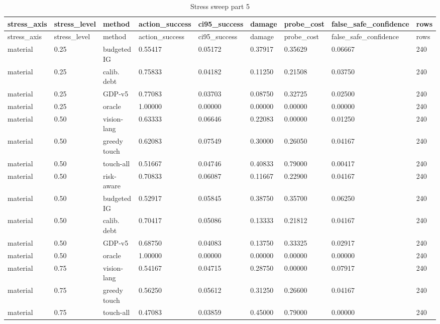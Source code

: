 \documentclass{article}
\begin{document}
\begin{center}
\tiny
\renewcommand{\arraystretch}{0.92}
\setlength{\tabcolsep}{3pt}
\begin{longtable}{lllllllll}
\caption{Stress sweep part 5}\label{tab:stress-sweep-5}\\
\toprule
stress\_axis & stress\_level & method & action\_success & ci95\_success & damage & probe\_cost & false\_safe\_confidence & rows \\
\midrule
\endfirsthead
\toprule
stress\_axis & stress\_level & method & action\_success & ci95\_success & damage & probe\_cost & false\_safe\_confidence & rows \\
\midrule
\endhead
material & 0.25 & budgeted IG & 0.55417 & 0.05172 & 0.37917 & 0.35629 & 0.06667 & 240 \\
material & 0.25 & calib. debt & 0.75833 & 0.04182 & 0.11250 & 0.21508 & 0.03750 & 240 \\
material & 0.25 & GDP-v5 & 0.77083 & 0.03703 & 0.08750 & 0.32725 & 0.02500 & 240 \\
material & 0.25 & oracle & 1.00000 & 0.00000 & 0.00000 & 0.00000 & 0.00000 & 240 \\
material & 0.50 & vision-lang & 0.63333 & 0.06646 & 0.22083 & 0.00000 & 0.01250 & 240 \\
material & 0.50 & greedy touch & 0.62083 & 0.07549 & 0.30000 & 0.26050 & 0.04167 & 240 \\
material & 0.50 & touch-all & 0.51667 & 0.04746 & 0.40833 & 0.79000 & 0.00417 & 240 \\
material & 0.50 & risk-aware & 0.70833 & 0.06087 & 0.11667 & 0.22900 & 0.04167 & 240 \\
material & 0.50 & budgeted IG & 0.52917 & 0.05845 & 0.38750 & 0.35700 & 0.06250 & 240 \\
material & 0.50 & calib. debt & 0.70417 & 0.05086 & 0.13333 & 0.21812 & 0.04167 & 240 \\
material & 0.50 & GDP-v5 & 0.68750 & 0.04083 & 0.13750 & 0.33325 & 0.02917 & 240 \\
material & 0.50 & oracle & 1.00000 & 0.00000 & 0.00000 & 0.00000 & 0.00000 & 240 \\
material & 0.75 & vision-lang & 0.54167 & 0.04715 & 0.28750 & 0.00000 & 0.07917 & 240 \\
material & 0.75 & greedy touch & 0.56250 & 0.05612 & 0.31250 & 0.26600 & 0.04167 & 240 \\
material & 0.75 & touch-all & 0.47083 & 0.03859 & 0.45000 & 0.79000 & 0.00000 & 240 \\

\end{longtable}
\end{center}
\end{document}
